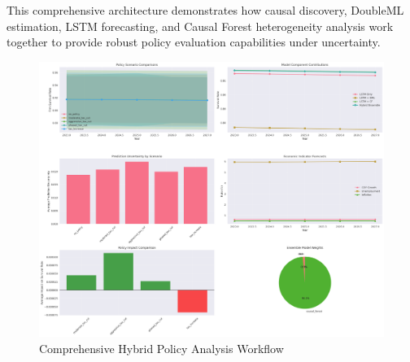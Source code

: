 This comprehensive architecture demonstrates how causal discovery, DoubleML estimation, LSTM forecasting, and Causal Forest heterogeneity analysis work together to provide robust policy evaluation capabilities under uncertainty.
\begin{figure}[htbp]
    \centering
    \includegraphics[width=\textwidth]{figures/hybrid_policy_analysis_comprehensive.png}
    \caption{Comprehensive Hybrid Policy Analysis Workflow}
    \label{fig:hybrid_policy_analysis_comprehensive}
\end{figure}

